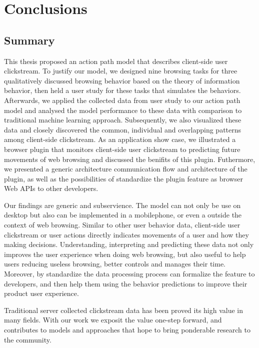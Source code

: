 \section{Conclusions}
\label{ch:final}

\subsection{Summary}


This thesis proposed an action path model that describes client-side user clickstream.
To justify our model, we designed nine browsing tasks for three qualitatively
discussed browsing behavior based on the theory of information behavior, then 
held a user study for these tasks that simulates the behaviors. 
Afterwards, we applied the collected data from user study to our action path model and
analysed the model performance to these data with comparison to traditional machine 
learning approach.
Subsequently, we also visualized these data and closely discovered the common, 
individual and overlapping patterns among client-side clickstream.
As an application show case, we illustrated a browser plugin that monitors client-side 
user clickstream to predicting future movements of web browsing and discussed the benifits of this plugin.
Futhermore, we presented a generic architecture communication flow and architecture of the plugin, as well as the possibilities of standardize the plugin feature as browser Web APIs to other developers.



Our findings are generic and subservience. The model can not only be use on desktop but
also can be implemented in a mobilephone, or even a outside the context of web browsing. 
Similar to other user behavior data, client-side user clickstream or user actions 
directly indicates movements of a user and how they making decisions. Understanding, 
interpreting and predicting these data not only improves the user experience when doing
web browsing, but also useful to help users reducing useless browsing, better controls 
and manages their time. Moreover, by standardize the data processing process can formalize
the feature to developers, and then help them using the behavior predictions to
improve their product user experience.

Traditional server collected clickstream data has been proved its high value in many fields. With our work we exposit the value one-step forward, and contributes to models and approaches that hope to bring ponderable research to the community.


\cleardoublepage